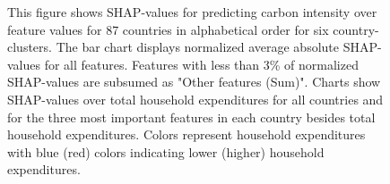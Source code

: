 \begin{figure}[ht!]
    \begin{subcaption2}
     This figure shows SHAP-values for predicting carbon intensity over feature values for 87 countries in alphabetical order for six country-clusters. The bar chart displays normalized average absolute SHAP-values for all features. Features with less than 3\% of normalized SHAP-values are subsumed as "Other features (Sum)". Charts show SHAP-values over total household expenditures for all countries and for the three most important features in each country besides total household expenditures. Colors represent household expenditures with blue (red) colors indicating lower (higher) household expenditures.
     \end{subcaption2}
\end{figure}